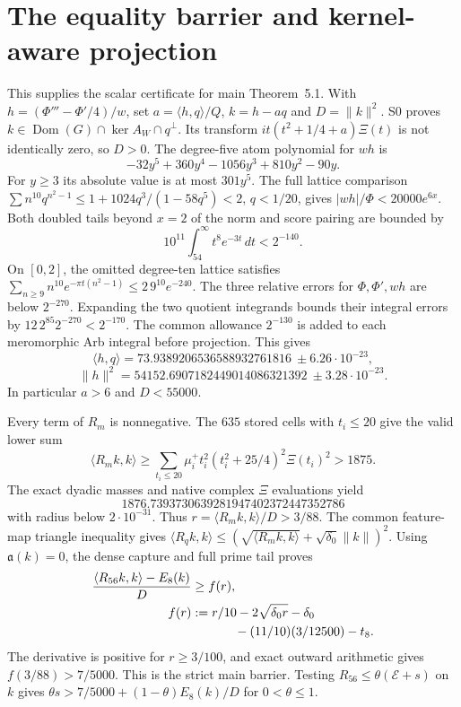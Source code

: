 \documentclass[11pt]{article}
\newcommand{\Dom}{\operatorname{Dom}}
\newcommand{\dd}{\,d}
\numberwithin{equation}{section}
\begin{document}
\section{The equality barrier and kernel-aware projection}\label{barriersupp}
This supplies the scalar certificate for main Theorem~5.1.
With $h=(\Phi'''-\Phi'/4)/w$, set
$a=\langle h,q\rangle/Q$, $k=h-aq$ and $D=\|k\|^2$.
S0 proves $k\in\Dom(G)\cap\ker A_W\cap q^\perp$.
Its transform $it(t^2+1/4+a)\Xi(t)$ is not identically zero, so $D>0$.
The degree-five atom polynomial for $wh$ is
\[
 -32y^5+360y^4-1056y^3+810y^2-90y.
\]
For $y\ge3$ its absolute value is at most $301y^5$. The full lattice
comparison
$\sum n^{10}q^{n^2-1}\le1+1024q^3/(1-58q^5)<2$, $q<1/20$,
gives $|wh|/\Phi<20000e^{6x}$.
Both doubled tails beyond $x=2$ of the norm and score pairing are
bounded by
\[
 10^{11}\int_{54}^\infty t^8e^{-3t}\dd t<2^{-140}.
\]
On $[0,2]$, the omitted degree-ten lattice satisfies
$\sum_{n\ge9}n^{10}e^{-\pi t(n^2-1)}\le2\,9^{10}e^{-240}$.
The three relative errors for $\Phi,\Phi',wh$ are below $2^{-270}$.
Expanding the two quotient integrands bounds their integral errors
by $12\,2^{85}2^{-270}<2^{-170}$. The common allowance $2^{-130}$
is added to each meromorphic Arb integral before projection.
This gives
\[
 \langle h,q\rangle=73.9389206536588932761816\ \pm6.26\cdot10^{-23},
\]
\[
 \|h\|^2=54152.6907182449014086321392\ \pm3.28\cdot10^{-23}.
\]
In particular $a>6$ and $D<55000$.

Every term of $R_m$ is nonnegative. The $635$ stored cells with
$t_i\le20$ give the valid lower sum
\[
 \langle R_mk,k\rangle\ge
 \sum_{t_i\le20}\mu_i^+t_i^2(t_i^2+25/4)^2\Xi(t_i)^2>1875.
\]
The exact dyadic masses and native complex $\Xi$ evaluations yield
\[1876.7393730639281947402372447352786\]
with radius below $2\cdot10^{-31}$. Thus $r=\langle R_mk,k\rangle/D>3/88$.
The common feature-map triangle inequality gives
$\langle R_qk,k\rangle\le
(\sqrt{\langle R_mk,k\rangle}+\sqrt{\delta_0}\|k\|)^2$.
Using $\mathfrak a(k)=0$, the dense capture and full prime tail proves
\begin{align*}
 \frac{\langle R_{56}k,k\rangle-E_8(k)}D&\ge f(r),\\
 f(r)&:=r/10-2\sqrt{\delta_0r}-\delta_0\\
     &\hspace{12mm}-(11/10)(3/12500)-t_8.
\end{align*}
The derivative is positive for $r\ge3/100$, and exact outward
arithmetic gives $f(3/88)>7/5000$. This is the strict main barrier.
Testing $R_{56}\le\theta(\mathcal E+s)$ on $k$ gives
$\theta s>7/5000+(1-\theta)E_8(k)/D$ for $0<\theta\le1$.
\end{document}
